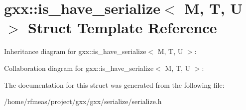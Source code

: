 \hypertarget{structgxx_1_1is__have__serialize}{}\section{gxx\+:\+:is\+\_\+have\+\_\+serialize$<$ M, T, U $>$ Struct Template Reference}
\label{structgxx_1_1is__have__serialize}


Inheritance diagram for gxx\+:\+:is\+\_\+have\+\_\+serialize$<$ M, T, U $>$\+:


Collaboration diagram for gxx\+:\+:is\+\_\+have\+\_\+serialize$<$ M, T, U $>$\+:


The documentation for this struct was generated from the following file\+:\begin{DoxyCompactItemize}
\item 
/home/rfmeas/project/gxx/gxx/serialize/serialize.\+h\end{DoxyCompactItemize}
